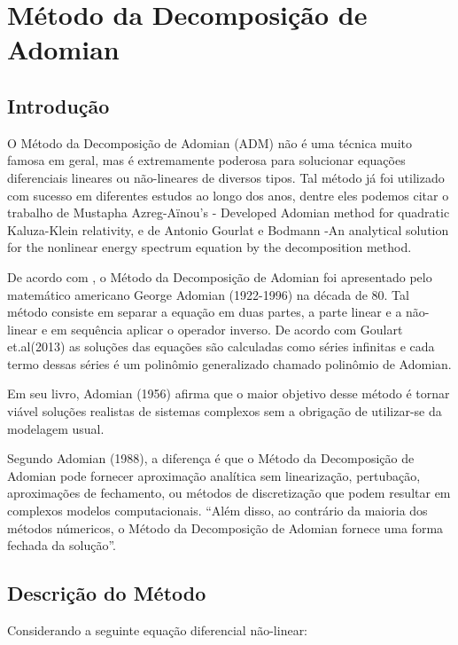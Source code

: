
\chapter[Método da Decomposição]{Método da Decomposição de Adomian}

\section{Introdução}

   O Método da Decomposição de Adomian (ADM) não é uma técnica muito famosa em geral, mas é extremamente poderosa para solucionar equações diferenciais lineares ou não-lineares de diversos tipos. Tal método já foi utilizado com sucesso em diferentes estudos ao longo dos anos, dentre eles podemos citar o trabalho de Mustapha Azreg-Aïnou's - Developed Adomian method for quadratic Kaluza-Klein relativity, e de Antonio Gourlat e Bodmann -An analytical solution for the nonlinear energy spectrum equation by the decomposition method.
   
    De acordo com , o Método da Decomposição de Adomian foi apresentado pelo  matemático americano George Adomian (1922-1996) na década de 80. Tal método consiste em separar a equação em duas partes, a parte linear e a não-linear e em sequência aplicar o operador inverso. De acordo com Goulart et.al(2013) as soluções das equações são calculadas como séries infinitas e cada termo dessas séries é um polinômio generalizado chamado polinômio de Adomian.

    
   Em seu livro, Adomian (1956) afirma que o maior objetivo desse método é tornar viável soluções realistas de sistemas complexos sem a obrigação de utilizar-se da modelagem usual.
   
  Segundo Adomian (1988), a diferença é que o Método da Decomposição de Adomian pode fornecer aproximação analítica sem linearização, pertubação, aproximações de fechamento, ou métodos de discretização que podem resultar em complexos modelos computacionais.
   ``Além disso, ao contrário da maioria dos métodos númericos, o Método da Decomposição de Adomian fornece uma forma fechada da solução''.

  
   

\section{Descrição do Método} 
 
 
 Considerando a seguinte equação diferencial não-linear:
 
